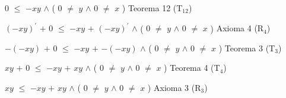 \documentclass[12pt]{article}
\begin{document}
$0$ $\leq$ $-xy$  \hspace{0.2cm}  $\wedge$ \hspace{0.2cm} ( \hspace{0.2cm} $0$ $\neq$ $y$ \hspace{0.2cm} $\wedge$ \hspace{0.2cm} $0$ $\neq$ $x$ \hspace{0.2cm} ) \hspace{4.3cm} {\textcolor{carrotorange}{Teorema 12 (T$_{12}$)}} \vspace{0.5cm}

$(-xy)^{\prime}$ $+$ $0$ $\leq$ $-xy$ $+$ $(-xy)^{\prime}$  \hspace{0.2cm}  $\wedge$ \hspace{0.2cm} ( \hspace{0.2cm} $0$ $\neq$ $y$ \hspace{0.2cm} $\wedge$ \hspace{0.2cm} $0$ $\neq$ $x$ \hspace{0.2cm} ) \hspace{0.4cm} {\textcolor{carrotorange}{Axioma 4 (R$_{4}$)}} \vspace{0.5cm}

$-(-xy)$ $+$ $0$ $\leq$ $-xy$ $+$ $-(-xy)$  \hspace{0.2cm}  $\wedge$ \hspace{0.2cm} ( \hspace{0.2cm} $0$ $\neq$ $y$ \hspace{0.2cm} $\wedge$ \hspace{0.2cm} $0$ $\neq$ $x$ \hspace{0.2cm} ) {\textcolor{carrotorange}{Teorema 3 (T$_{3}$)}} \vspace{0.5cm}

$xy$ $+$ $0$ $\leq$ $-xy$ $+$ $xy$  \hspace{0.2cm}  $\wedge$ \hspace{0.2cm} ( \hspace{0.2cm} $0$ $\neq$ $y$ \hspace{0.2cm} $\wedge$ \hspace{0.2cm} $0$ $\neq$ $x$ \hspace{0.2cm} ) \hspace{2cm} {\textcolor{carrotorange}{Teorema 4 (T$_{4}$)}} \vspace{0.5cm}

$xy$ $\leq$ $-xy$ $+$ $xy$  \hspace{0.2cm}  $\wedge$ \hspace{0.2cm} ( \hspace{0.2cm} $0$ $\neq$ $y$ \hspace{0.2cm} $\wedge$ \hspace{0.2cm} $0$ $\neq$ $x$ \hspace{0.2cm} ) \hspace{3cm} {\textcolor{carrotorange}{Axioma 3 (R$_{3}$)}} \vspace{0.5cm}
\end{document}

